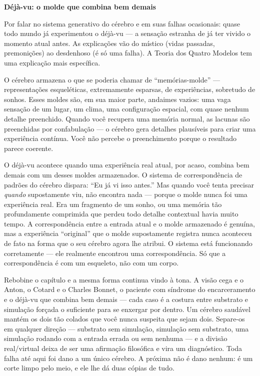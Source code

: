 \documentclass[11pt, twoside, openright]{book}
\begin{document}
\textbf{Déjà-vu: o molde que combina bem demais}

Por falar no sistema generativo do cérebro e em suas falhas ocasionais: quase todo mundo já experimentou o déjà-vu --- a sensação estranha de já ter vivido o momento atual antes. As explicações vão do místico (vidas passadas, premonições) ao desdenhoso (é só uma falha). A Teoria dos Quatro Modelos tem uma explicação mais específica.

O cérebro armazena o que se poderia chamar de ``memórias-molde'' --- representações esqueléticas, extremamente esparsas, de experiências, sobretudo de sonhos. Esses moldes são, em sua maior parte, andaimes vazios: uma vaga sensação de um lugar, um clima, uma configuração espacial, com quase nenhum detalhe preenchido. Quando você recupera uma memória normal, as lacunas são preenchidas por confabulação --- o cérebro gera detalhes plausíveis para criar uma experiência contínua. Você não percebe o preenchimento porque o resultado parece coerente.

O déjà-vu acontece quando uma experiência real atual, por acaso, combina bem demais com um desses moldes armazenados. O sistema de correspondência de padrões do cérebro dispara: ``Eu já vi isso antes.'' Mas quando você tenta precisar \textit{quando} supostamente viu, não encontra nada --- porque o molde nunca foi uma experiência real. Era um fragmento de um sonho, ou uma memória tão profundamente comprimida que perdeu todo detalhe contextual havia muito tempo. A correspondência entre a entrada atual e o molde armazenado é genuína, mas a experiência ``original'' que o molde supostamente registra nunca aconteceu de fato na forma que o seu cérebro agora lhe atribui. O sistema está funcionando corretamente --- ele realmente encontrou uma correspondência. Só que a correspondência é com um esqueleto, não com um corpo.

Rebobine o capítulo e a mesma forma continua vindo à tona. A visão cega e o Anton, o Cotard e o Charles Bonnet, o paciente com síndrome do encarceramento e o déjà-vu que combina bem demais --- cada caso é a costura entre substrato e simulação forçada o suficiente para se enxergar por dentro. Um cérebro saudável mantém os dois tão colados que você nunca suspeita que sejam dois. Separe-os em qualquer direção --- substrato sem simulação, simulação sem substrato, uma simulação rodando com a entrada errada ou sem nenhuma --- e a divisão real/\allowbreak{}virtual deixa de ser uma afirmação filosófica e vira um diagnóstico. Toda falha até aqui foi dano a um único cérebro. A próxima não é dano nenhum: é um corte limpo pelo meio, e ele lhe dá duas cópias de tudo.
\end{document}
